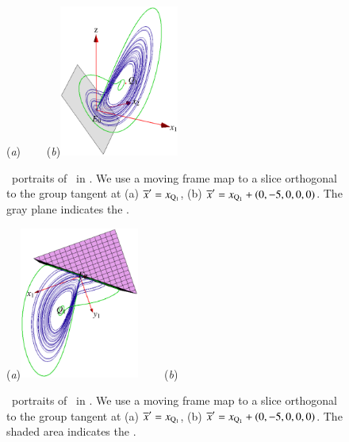 \begin{figure}[ht]
\begin{center}
  (\textit{a})%
~~~~(\textit{b})\includegraphics[width=0.35\textwidth,clip=true]{../figs/CLEmfAdHoc123}
\end{center}
\caption{
\Statesp\ portraits of \cLf\ in \reducedsp. We use a
moving frame map to a slice orthogonal to the group tangent
at  (a) ${\overline{x}'}  = x_{\mathrm{Q}_{1}}$, (b) ${\overline{x}'}  =
x_{\mathrm{Q}_{1}}+(0,-5,0,0,0)$. The gray plane indicates the \sset.
    }\label{fig:CLEmfssetOld}
\end{figure}

\begin{figure}[ht]
\begin{center}
  (\textit{a})\includegraphics[width=0.35\textwidth,clip=true]{../figs/CLEmfReqb135}
~~~~(\textit{b})%
\end{center}
\caption{
\Statesp\ portraits of \cLf\ in \reducedsp. We use a
moving frame map to a slice orthogonal to the group tangent
at  (a) ${\overline{x}'}  = x_{\mathrm{Q}_{1}}$, (b) ${\overline{x}'}  =
x_{\mathrm{Q}_{1}}+(0,-5,0,0,0)$. The shaded area indicates the \sset.
    }
\label{fig:CLEmfAdHoc}
\end{figure}

